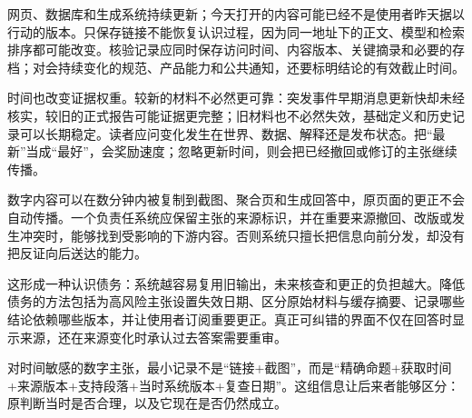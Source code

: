网页、数据库和生成系统持续更新；今天打开的内容可能已经不是使用者昨天据以行动的版本。只保存链接不能恢复认识过程，因为同一地址下的正文、模型和检索排序都可能改变。核验记录应同时保存访问时间、内容版本、关键摘录和必要的存档；对会持续变化的规范、产品能力和公共通知，还要标明结论的有效截止时间。

时间也改变证据权重。较新的材料不必然更可靠：突发事件早期消息更新快却未经核实，较旧的正式报告可能证据更完整；旧材料也不必然失效，基础定义和历史记录可以长期稳定。读者应问变化发生在世界、数据、解释还是发布状态。把“最新”当成“最好”，会奖励速度；忽略更新时间，则会把已经撤回或修订的主张继续传播。

数字内容可以在数分钟内被复制到截图、聚合页和生成回答中，原页面的更正不会自动传播。一个负责任系统应保留主张的来源标识，并在重要来源撤回、改版或发生冲突时，能够找到受影响的下游内容。否则系统只擅长把信息向前分发，却没有把反证向后送达的能力。

这形成一种认识债务：系统越容易复用旧输出，未来核查和更正的负担越大。降低债务的方法包括为高风险主张设置失效日期、区分原始材料与缓存摘要、记录哪些结论依赖哪些版本，并让使用者订阅重要更正。真正可纠错的界面不仅在回答时显示来源，还在来源变化时承认过去答案需要重审。

\begin{argumentbox}
对时间敏感的数字主张，最小记录不是“链接+截图”，而是“精确命题+获取时间+来源版本+支持段落+当时系统版本+复查日期”。这组信息让后来者能够区分：原判断当时是否合理，以及它现在是否仍然成立。
\end{argumentbox}


